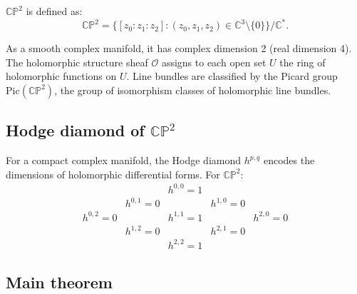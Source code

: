 $\mathbb{CP}^2$ is defined as:
\begin{equation}
\mathbb{CP}^2 = \{[z_0 : z_1 : z_2] : (z_0, z_1, z_2) \in \mathbb{C}^3 \setminus \{0\}\} / \mathbb{C}^*.
\end{equation}

As a smooth complex manifold, it has complex dimension 2 (real dimension 4).
The holomorphic structure sheaf $\mathcal{O}$ assigns to each open set $U$ the
ring of holomorphic functions on $U$. Line bundles are classified by the Picard
group $\mathrm{Pic}(\mathbb{CP}^2)$, the group of isomorphism classes of
holomorphic line bundles.

\subsection{Hodge diamond of $\mathbb{CP}^2$}

For a compact complex manifold, the Hodge diamond $h^{p,q}$ encodes the dimensions
of holomorphic differential forms. For $\mathbb{CP}^2$:
\begin{equation}
\begin{array}{ccccc}
  &  & h^{0,0} = 1 \\
  & h^{0,1} = 0 & & h^{1,0} = 0 \\
h^{0,2} = 0 & & h^{1,1} = 1 & & h^{2,0} = 0 \\
  & h^{1,2} = 0 & & h^{2,1} = 0 \\
  &  & h^{2,2} = 1
\end{array}
\end{equation}

\subsection{Main theorem}

